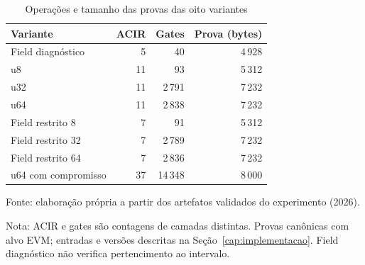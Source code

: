 \begin{table}[htbp]
\centering
\caption{Operações e tamanho das provas das oito variantes}
\label{tab:circuitos}
\begin{tabular}{lrrr}
\hline
Variante & ACIR & Gates & Prova (bytes) \\
\hline
Field diagnóstico & 5 & 40 & 4\,928 \\
u8 & 11 & 93 & 5\,312 \\
u32 & 11 & 2\,791 & 7\,232 \\
u64 & 11 & 2\,838 & 7\,232 \\
Field restrito 8 & 7 & 91 & 5\,312 \\
Field restrito 32 & 7 & 2\,789 & 7\,232 \\
Field restrito 64 & 7 & 2\,836 & 7\,232 \\
u64 com compromisso & 37 & 14\,348 & 8\,000 \\
\hline
\end{tabular}
\par\smallskip
\begin{minipage}{\textwidth}
\renewcommand{\baselinestretch}{1}\small
Fonte: elaboração própria a partir dos artefatos validados do experimento (2026).\par
Nota: ACIR e gates são contagens de camadas distintas. Provas canônicas com alvo EVM; entradas e versões descritas na Seção~\ref{cap:implementacao}. Field diagnóstico não verifica pertencimento ao intervalo.
\end{minipage}
\end{table}
